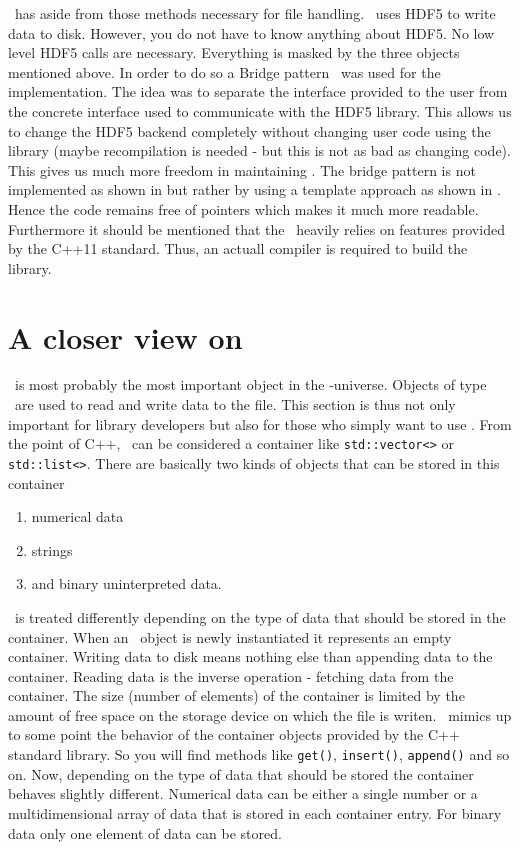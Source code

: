 \nxgroup\ has aside from those methods necessary for file handling. 
\pninx\ uses HDF5 to write data to disk. However, you do not have to know 
anything about HDF5. No low level HDF5 calls are necessary. Everything is 
masked by the three objects mentioned above. 
In order to do so a Bridge pattern~\cite{book:gof} was used for the
implementation. The idea was to separate the interface provided to the user from the 
concrete interface used to communicate with the HDF5 library. 
This allows us to change the HDF5 backend completely without changing 
user code using the library (maybe recompilation is needed - but this is not as
bad as changing code). This gives us much more freedom in maintaining \pninx.
The bridge pattern is not implemented as shown in \cite{book:gof} but rather 
by using a template approach as shown  in \cite{book:alexandrescu}.
Hence the code remains free of pointers which makes it much more readable. 
Furthermore it should be mentioned that the \pninx\ heavily relies on features 
provided by the C++11 standard. Thus, an actuall compiler is required to 
build the library.
 

\section{A closer view on \nxfield}\label{section:nxfield_design}
\nxfield\ is most probably the most important object in the \pninx-universe. 
Objects of type \nxfield\ are used to read and write data to the file. 
This section is thus not only important for library developers but also 
for those who simply want to use \pninx. 
From the point of C++, \nxfield\ can be considered a container like 
{\tt std::vector<>} or {\tt std::list<>}.
There are basically two kinds of objects that can be stored in this container
\begin{enumerate}
  \item numerical data
  \item strings
  \item and binary uninterpreted data.
\end{enumerate}
\nxfield\ is treated differently depending on the type of data that should 
be stored in the container.
When an \nxfield\ object is newly instantiated it represents an empty container. 
Writing data to disk means nothing else than appending data to the container. 
Reading data is the inverse operation - fetching data from the container. 
The size (number of elements) of the container is limited by the amount of 
free space on the storage device on which the file is writen.
\nxfield\ mimics up to some point the behavior of the container objects
provided by the C++ standard library. So you will find methods like 
{\tt get()}, {\tt insert()}, {\tt append()} and so on. 
Now, depending on the type of data that should be stored  the container 
behaves slightly different. 
Numerical data can be either a single number or a multidimensional array of 
data that is stored in each container entry. 
For binary data only one element of data can be stored.


 

